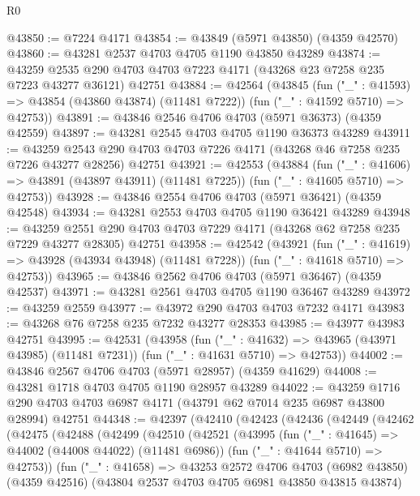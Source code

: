 \begin{lexlean}{R0}
\begin{coremodule}
@43850 := @7224 @4171
@43854 := @43849 (@5971 @43850) (@4359 @42570)
@43860 := @43281 @2537 @4703 @4705 @1190 @43850 @43289
@43874 := @43259
    @2535
    @290
    @4703
    @4703
    @7223
    @4171
    (@43268 @23 @7258 @235 @7223 @43277 @36121)
    @42751
@43884 := @42564
    (@43845
      (fun ("_" : @41593) => @43854 (@43860 @43874) (@11481 @7222))
      (fun ("_" : @41592 @5710) => @42753))
@43891 := @43846 @2546 @4706 @4703 (@5971 @36373) (@4359 @42559)
@43897 := @43281 @2545 @4703 @4705 @1190 @36373 @43289
@43911 := @43259
    @2543
    @290
    @4703
    @4703
    @7226
    @4171
    (@43268 @46 @7258 @235 @7226 @43277 @28256)
    @42751
@43921 := @42553
    (@43884
      (fun ("_" : @41606) => @43891 (@43897 @43911) (@11481 @7225))
      (fun ("_" : @41605 @5710) => @42753))
@43928 := @43846 @2554 @4706 @4703 (@5971 @36421) (@4359 @42548)
@43934 := @43281 @2553 @4703 @4705 @1190 @36421 @43289
@43948 := @43259
    @2551
    @290
    @4703
    @4703
    @7229
    @4171
    (@43268 @62 @7258 @235 @7229 @43277 @28305)
    @42751
@43958 := @42542
    (@43921
      (fun ("_" : @41619) => @43928 (@43934 @43948) (@11481 @7228))
      (fun ("_" : @41618 @5710) => @42753))
@43965 := @43846 @2562 @4706 @4703 (@5971 @36467) (@4359 @42537)
@43971 := @43281 @2561 @4703 @4705 @1190 @36467 @43289
@43972 := @43259 @2559
@43977 := @43972 @290 @4703 @4703 @7232 @4171
@43983 := @43268 @76 @7258 @235 @7232 @43277 @28353
@43985 := @43977 @43983 @42751
@43995 := @42531
    (@43958
      (fun ("_" : @41632) => @43965 (@43971 @43985) (@11481 @7231))
      (fun ("_" : @41631 @5710) => @42753))
@44002 := @43846 @2567 @4706 @4703 (@5971 @28957) (@4359 @41629)
@44008 := @43281 @1718 @4703 @4705 @1190 @28957 @43289
@44022 := @43259
    @1716
    @290
    @4703
    @4703
    @6987
    @4171
    (@43791 @62 @7014 @235 @6987 @43800 @28994)
    @42751
@44348 := @42397
    (@42410
      (@42423
        (@42436
          (@42449
            (@42462
              (@42475
                (@42488
                  (@42499
                    (@42510
                      (@42521
                        (@43995
                          (fun ("_" : @41645) => @44002 (@44008 @44022) (@11481 @6986))
                          (fun ("_" : @41644 @5710) => @42753))
                        (fun ("_" : @41658) =>
                        @43253
                          @2572
                          @4706
                          @4703
                          (@6982 @43850)
                          (@4359 @42516)
                          (@43804 @2537 @4703 @4705 @6981 @43850 @43815 @43874)

\end{coremodule}
\end{lexlean}
